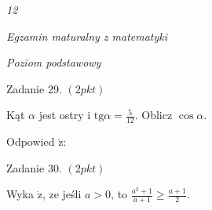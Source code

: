 \documentclass[a4paper,12pt]{article}
\begin{document}
{\it 12}

{\it Egzamin maturalny z matematyki}

{\it Poziom podstawowy}

Zadanie 29. $(2pkt)$

Kąt $\alpha$ jest ostry i $\displaystyle \mathrm{t}\mathrm{g}\alpha=\frac{5}{12}$. Oblicz $\cos\alpha.$

Odpowied $\acute{\mathrm{z}}$:

Zadanie 30. $(2pkt)$

Wyka $\dot{\mathrm{z}}$, ze jeśli $a>0$, to $\displaystyle \frac{a^{2}+1}{a+1}\geq\frac{a+1}{2}.$
\end{document}
